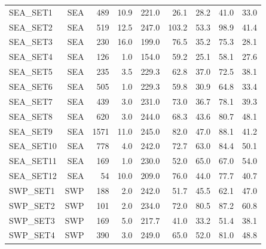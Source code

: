 \documentclass[final]{agujournal2019}
\begin{document}
\begin{longtable}[]{@{}lrrrrrrrr@{}}
SEA\_SET1 & SEA & 489 & 10.9 & 221.0 & 26.1 & 28.2 & 41.0 & 33.0 \\
SEA\_SET2 & SEA & 519 & 12.5 & 247.0 & 103.2 & 53.3 & 98.9 & 41.4 \\
SEA\_SET3 & SEA & 230 & 16.0 & 199.0 & 76.5 & 35.2 & 75.3 & 28.1 \\
SEA\_SET4 & SEA & 126 & 1.0 & 154.0 & 59.2 & 25.1 & 58.1 & 27.6 \\
SEA\_SET5 & SEA & 235 & 3.5 & 229.3 & 62.8 & 37.0 & 72.5 & 38.1 \\
SEA\_SET6 & SEA & 505 & 1.0 & 229.3 & 59.8 & 30.9 & 64.8 & 33.4 \\
SEA\_SET7 & SEA & 439 & 3.0 & 231.0 & 73.0 & 36.7 & 78.1 & 39.3 \\
SEA\_SET8 & SEA & 620 & 3.0 & 244.0 & 68.3 & 43.6 & 80.7 & 48.1 \\
SEA\_SET9 & SEA & 1571 & 11.0 & 245.0 & 82.0 & 47.0 & 88.1 & 41.2 \\
SEA\_SET10 & SEA & 778 & 4.0 & 242.0 & 72.7 & 63.0 & 84.4 & 50.1 \\
SEA\_SET11 & SEA & 169 & 1.0 & 230.0 & 52.0 & 65.0 & 67.0 & 54.0 \\
SEA\_SET12 & SEA & 54 & 10.0 & 209.0 & 76.0 & 44.0 & 77.7 & 40.7 \\
SWP\_SET1 & SWP & 188 & 2.0 & 242.0 & 51.7 & 45.5 & 62.1 & 47.0 \\
SWP\_SET2 & SWP & 101 & 2.0 & 234.0 & 72.0 & 80.5 & 87.2 & 60.8 \\
SWP\_SET3 & SWP & 169 & 5.0 & 217.7 & 41.0 & 33.2 & 51.4 & 38.1 \\
SWP\_SET4 & SWP & 390 & 3.0 & 249.0 & 65.0 & 52.0 & 81.0 & 48.8 \\
\end{longtable}

\clearpage
\end{document}
